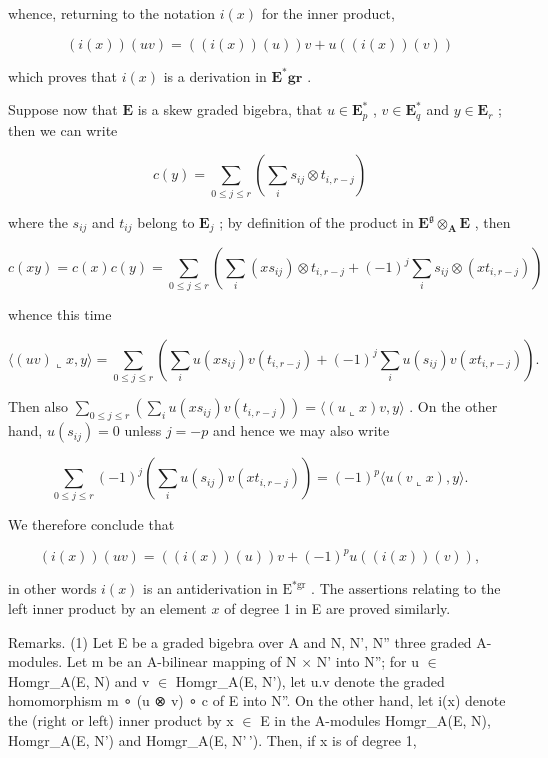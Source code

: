 whence, returning to the notation \(i(x)\) for the inner product,

\[
(i (x)) (u v) = ((i (x)) (u)) v + u ((i (x)) (v))\tag{64}
\]

which proves that \(i(x)\) is a derivation in \(\mathbf{E}^{*}\mathbf{gr}\) .

Suppose now that \(\mathbf{E}\) is a skew graded bigebra, that \(u\in \mathbf{E}_p^*\) , \(v\in \mathbf{E}_q^*\) and \(y\in \mathbf{E}_r\) ; then we can write

\[
c (y) = \sum_ {0 \leqslant j \leqslant r} \left(\sum_ {i} s _ {i j} \otimes t _ {i, r - j}\right)
\]

where the \(s_{ij}\) and \(t_{ij}\) belong to \(\mathbf{E}_j\) ; by definition of the product in \(\mathbf{E}^{\mathfrak{g}} \otimes_{\mathbf{A}} \mathbf{E}\) , then

\[
c (x y) = c (x) c (y) = \sum_ {0 \leqslant j \leqslant r} \left(\sum_ {i} \left(x s _ {i j}\right) \otimes t _ {i, r - j} + (- 1) ^ {j} \sum_ {i} s _ {i j} \otimes \left(x t _ {i, r - j}\right)\right)
\]

whence this time

\[
\langle (u v) \llcorner x, y \rangle = \sum_ {0 \leqslant j \leqslant r} \left(\sum_ {i} u \left(x s _ {i j}\right) v \left(t _ {i, r - j}\right) + (- 1) ^ {j} \sum_ {i} u \left(s _ {i j}\right) v \left(x t _ {i, r - j}\right)\right).
\]

Then also \(\sum_{0\leqslant j\leqslant r}\left(\sum_{i}u(xs_{ij})v(t_{i,r - j})\right) = \langle (u\llcorner x)v,y\rangle\) . On the other hand, \(u(s_{ij}) = 0\) unless \(j = -p\) and hence we may also write

\[
\sum_ {0 \leqslant j \leqslant r} (- 1) ^ {j} \left(\sum_ {i} u (s _ {i j}) v (x t _ {i, r - j})\right) = (- 1) ^ {p} \langle u (v \llcorner x), y \rangle .
\]

We therefore conclude that

\[
(i (x)) (u v) = ((i (x)) (u)) v + (- 1) ^ {p} u ((i (x)) (v)),\tag{65}
\]

in other words \(i(x)\) is an antiderivation in \(\mathrm{E}^{*\mathrm{gr}}\) . The assertions relating to the left inner product by an element \(x\) of degree 1 in E are proved similarly.

Remarks. (1) Let E be a graded bigebra over A and N, N', N'' three graded A-modules. Let m be an A-bilinear mapping of N × N' into N''; for u \ensuremath{\in} Homgr\_A(E, N) and v \ensuremath{\in} Homgr\_A(E, N'), let u.v denote the graded homomorphism m ∘ (u ⊗ v) ∘ c of E into N''. On the other hand, let i(x) denote the (right or left) inner product by x \ensuremath{\in} E in the A-modules Homgr\_A(E, N), Homgr\_A(E, N') and Homgr\_A(E, N'\,'). Then, if x is of degree 1,

